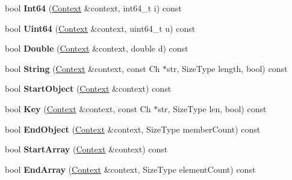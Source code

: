 \begin{DoxyCompactItemize}
bool {\bfseries Int64} (\hyperlink{structinternal_1_1SchemaValidationContext}{Context} \&context, int64\+\_\+t i) const
\item 
\mbox{\label{classinternal_1_1Schema_a1f80b1a9502b71530a98694e7b54987d}} 
bool {\bfseries Uint64} (\hyperlink{structinternal_1_1SchemaValidationContext}{Context} \&context, uint64\+\_\+t u) const
\item 
\mbox{\label{classinternal_1_1Schema_a8336bcea8d0e802c4b070da18e04f1dd}} 
bool {\bfseries Double} (\hyperlink{structinternal_1_1SchemaValidationContext}{Context} \&context, double d) const
\item 
\mbox{\label{classinternal_1_1Schema_a8e652cbc67fa34181c3fd813c38d5280}} 
bool {\bfseries String} (\hyperlink{structinternal_1_1SchemaValidationContext}{Context} \&context, const Ch $\ast$str, Size\+Type length, bool) const
\item 
\mbox{\label{classinternal_1_1Schema_a124c90c0b46d8a06ae5c0314467b6363}} 
bool {\bfseries Start\+Object} (\hyperlink{structinternal_1_1SchemaValidationContext}{Context} \&context) const
\item 
\mbox{\label{classinternal_1_1Schema_abdd4db48f1b6deb7881777ddc539709a}} 
bool {\bfseries Key} (\hyperlink{structinternal_1_1SchemaValidationContext}{Context} \&context, const Ch $\ast$str, Size\+Type len, bool) const
\item 
\mbox{\label{classinternal_1_1Schema_a5f74464dae5d41d5cbf626c8d6729d8a}} 
bool {\bfseries End\+Object} (\hyperlink{structinternal_1_1SchemaValidationContext}{Context} \&context, Size\+Type member\+Count) const
\item 
\mbox{\label{classinternal_1_1Schema_a094fbac3c04493aae304ef3011866f34}} 
bool {\bfseries Start\+Array} (\hyperlink{structinternal_1_1SchemaValidationContext}{Context} \&context) const
\item 
\mbox{\label{classinternal_1_1Schema_a7cae24caa7c2de31e7c5c07d23c737b3}} 
bool {\bfseries End\+Array} (\hyperlink{structinternal_1_1SchemaValidationContext}{Context} \&context, Size\+Type element\+Count) const
\end{DoxyCompactItemize}
